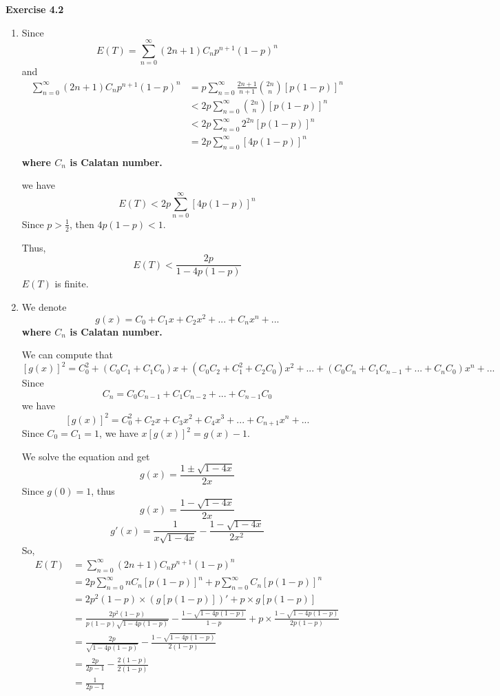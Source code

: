 \documentclass{article} %
\begin{document}
	\textbf{Exercise 4.2}\par
	\begin{enumerate}
	\item Since $$E(T)=\sum_{n=0}^\infty (2n+1)C_{n}p^{n+1}(1-p)^{n}$$ 
	and
	\begin{align*}
	\sum_{n=0}^\infty (2n+1)C_{n}p^{n+1}(1-p)^{n}&=p\sum_{n=0}^\infty \frac{2n+1}{n+1} \binom{2n}{n}[p(1-p)]^{n}\\
	&<2p\sum_{n=0}^\infty \binom{2n}{n}[p(1-p)]^{n}\\
	&<2p\sum_{n=0}^\infty 2^{2n}[p(1-p)]^{n}\\
	&=2p\sum_{n=0}^\infty [4p(1-p)]^{n}\\
	\end{align*}
	\textbf{where $C_{n}$ is Calatan number.}\par
	we have $$E(T)<2p\sum_{n=0}^\infty [4p(1-p)]^{n}$$
	Since $p>\frac{1}{2}$, then $4p(1-p)<1$.\par
	Thus, $$E(T)<\frac{2p}{1-4p(1-p)}$$ $E(T)$ is finite.
	\item We denote $$g(x)=C_0+C_1x+C_2x^2+...+C_{n}x^{n}+...$$ \textbf{where $C_{n}$ is Calatan number.}\par
	We can compute that $$[g(x)]^2=C_0^2+(C_0C_1+C_1C_0)x+(C_0C_2+C_1^2+C_2C_0)x^2+...+(C_0C_{n}+C_1C_{n-1}+...+C_{n}C_0)x^{n}+...$$
	Since $$C_{n}=C_0C_{n-1}+C_1C_{n-2}+...+C_{n-1}C_0$$
	we have $$[g(x)]^2=C_0^2+C_2x+C_3x^2+C_4x^3+...+C_{n+1}x^{n}+...$$
	Since $C_0=C_1=1$, we have $x[g(x)]^2=g(x)-1$.\par
	We solve the equation and get
	$$g(x)=\frac{1\pm\sqrt{1-4x}}{2x}$$
	Since $g(0)=1$, thus 
	$$g(x)=\frac{1-\sqrt{1-4x}}{2x}$$
	$$g'(x)=\frac{1}{x\sqrt{1-4x}}-\frac{1-\sqrt{1-4x}}{2x^2}$$
	So,
	\begin{align*}
	E(T)&=\sum_{n=0}^\infty (2n+1)C_{n}p^{n+1}(1-p)^{n}\\
	&=2p\sum_{n=0}^\infty nC_{n}[p(1-p)]^{n}+p\sum_{n=0}^\infty C_{n}[p(1-p)]^{n}\\
	&=2p^2(1-p)\times (g[p(1-p)])'+p\times g[p(1-p)]\\
	&=\frac{2p^2(1-p)}{p(1-p)\sqrt{1-4p(1-p)}}-\frac{1-\sqrt{1-4p(1-p)}}{1-p}+p\times \frac{1-\sqrt{1-4p(1-p)}}{2p(1-p)}\\
	&=\frac{2p}{\sqrt{1-4p(1-p)}}-\frac{1-\sqrt{1-4p(1-p)}}{2(1-p)}\\
	&=\frac{2p}{2p-1}-\frac{2(1-p)}{2(1-p)}\\
	&=\frac{1}{2p-1}
	\end{align*}
	\end{enumerate}
\end{document}
